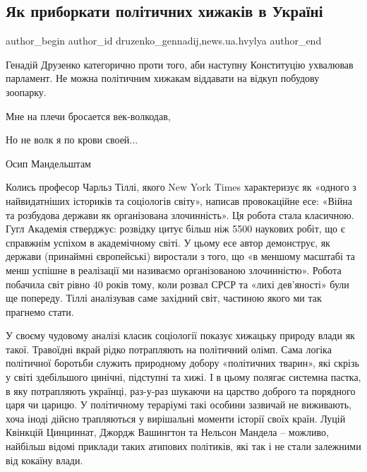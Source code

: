  
 
 
 
 
 
\subsection{Як приборкати політичних хижаків в Україні}
\label{sec:09_02_2022.stz.news.ua.hvylya.1.politychni_hyzhaky}
 
\ifcmt
 author_begin
   author_id druzenko_gennadij,news.ua.hvylya
 author_end
\fi

Генадій Друзенко категорично проти того, аби наступну Конституцію ухвалював
парламент. Не можна політичним хижакам віддавати на відкуп побудову зоопарку.

\begin{zznagolos}
Мне на плечи бросается век-волкодав,

Но не волк я по крови своей...

Осип Мандельштам
\end{zznagolos}

Колись професор Чарльз Тіллі, якого New York Times характеризує як «одного з
найвидатніших істориків та соціологів світу», написав провокаційне есе: «Війна
та розбудова держави як організована злочинність». Ця робота стала класичною.
Гугл Академія стверджує: розвідку цитує більш ніж 5500 наукових робіт, що є
справжнім успіхом в академічному світі. У цьому есе автор демонструє, як
держави (принаймні європейські) виростали з того, що «в меншому масштабі та
менш успішне в реалізації ми називаємо організованою злочинністю». Робота
побачила світ рівно 40 років тому, коли розвал СРСР та «лихі дев’яності» були
ще попереду. Тіллі аналізував саме західний світ, частиною якого ми так
прагнемо стати.


У своєму чудовому аналізі класик соціології показує хижацьку природу влади як
такої. Травоїдні вкрай рідко потрапляють на політичний олімп. Сама логіка
політичної боротьби служить природному добору «політичних тварин», які скрізь у
світі здебільшого цинічні, підступні та хижі. І в цьому полягає системна
пастка, в яку потрапляють українці, раз-у-раз шукаючи на царство доброго та
порядного царя чи царицю. У політичному тераріумі такі особини зазвичай не
виживають, хоча іноді дійсно трапляються у вирішальні моменти історії своїх
країн. Луцій Квінкцій Цинциннат, Джордж Вашингтон та Нельсон Мандела – можливо,
найбільш відомі приклади таких атипових політиків, які так і не стали залежними
від кокаїну влади.

